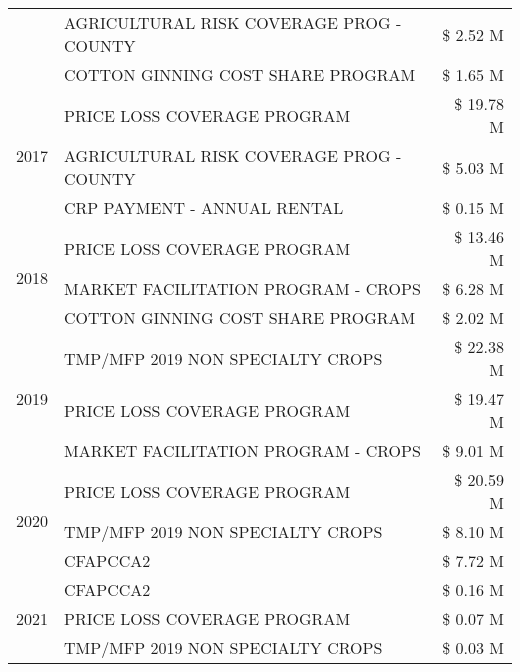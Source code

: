 \begin{tabular}{llr}
 & AGRICULTURAL RISK COVERAGE PROG - COUNTY      & \$ 2.52 M \\
 & COTTON GINNING COST SHARE PROGRAM             & \$ 1.65 M \\
\cline{1-3}
\multirow[t]{3}{*}{2017} & PRICE LOSS COVERAGE PROGRAM & \$ 19.78 M \\
 & AGRICULTURAL RISK COVERAGE PROG - COUNTY & \$ 5.03 M \\
 & CRP PAYMENT - ANNUAL RENTAL & \$ 0.15 M \\
\cline{1-3}
\multirow[t]{3}{*}{2018} & PRICE LOSS COVERAGE PROGRAM & \$ 13.46 M \\
 & MARKET FACILITATION PROGRAM - CROPS & \$ 6.28 M \\
 & COTTON GINNING COST SHARE PROGRAM & \$ 2.02 M \\
\cline{1-3}
\multirow[t]{3}{*}{2019} & TMP/MFP 2019 NON SPECIALTY CROPS & \$ 22.38 M \\
 & PRICE LOSS COVERAGE PROGRAM & \$ 19.47 M \\
 & MARKET FACILITATION PROGRAM - CROPS & \$ 9.01 M \\
\cline{1-3}
\multirow[t]{3}{*}{2020} & PRICE LOSS COVERAGE PROGRAM & \$ 20.59 M \\
 & TMP/MFP 2019 NON SPECIALTY CROPS & \$ 8.10 M \\
 & CFAPCCA2 & \$ 7.72 M \\
\cline{1-3}
\multirow[t]{3}{*}{2021} & CFAPCCA2 & \$ 0.16 M \\
 & PRICE LOSS COVERAGE PROGRAM & \$ 0.07 M \\
 & TMP/MFP 2019 NON SPECIALTY CROPS & \$ 0.03 M \\
\cline{1-3}
\bottomrule
\end{tabular}
